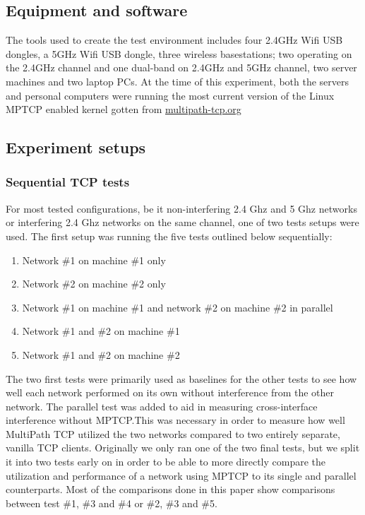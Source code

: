 \documentclass[12pt,a4paper]{article}
\begin{document}
\subsection{Equipment and software}
The tools used to create the test environment includes four 2.4GHz Wifi USB
dongles, a 5GHz Wifi USB dongle, three wireless basestations; two operating on
the 2.4GHz channel and one dual-band on 2.4GHz and  5GHz channel, two server
machines and two laptop PCs. At the time of this experiment, both the servers
and personal computers were running the most current version of the Linux MPTCP
enabled kernel gotten from \href{http://multipath-tcp.org/}{multipath-tcp.org}

\subsection{Experiment setups}
\subsubsection{Sequential TCP tests}
For most tested configurations, be it non-interfering 2.4 Ghz and 5 Ghz networks
or interfering 2.4 Ghz networks on the same channel, one of two tests setups
were used. The first setup was running the five tests outlined below
sequentially:

\begin{enumerate}
  \item Network \#1 on machine \#1 only
  \item Network \#2 on machine \#2 only
  \item Network \#1 on machine \#1 and network \#2 on machine \#2 in parallel
  \item Network \#1 and \#2 on machine \#1
  \item Network \#1 and \#2 on machine \#2
\end{enumerate}

The two first tests were primarily used as baselines for the other tests to see
how well each network performed on its own without interference from the other
network. The parallel test was added to aid in measuring cross-interface
interference without MPTCP.\@ This was necessary in order to measure how well
MultiPath TCP utilized the two networks compared to two entirely separate,
vanilla TCP clients. Originally we only ran one of the two final tests, but we
split it into two tests early on in order to be able to more directly compare
the utilization and performance of a network using MPTCP to its single and
parallel counterparts. Most of the comparisons done in this paper show
comparisons between test \#1, \#3 and \#4 or \#2, \#3 and \#5.
\end{document}
